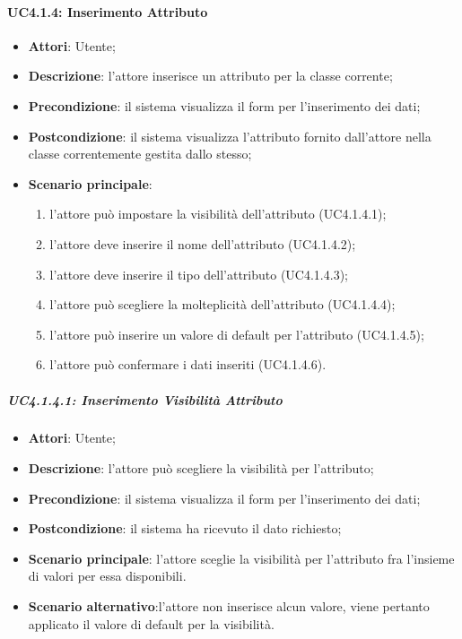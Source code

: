 \paragraph{UC4.1.4: Inserimento Attributo}
\label{UC4.1.4}
\begin{itemize}
\item \textbf{Attori}: Utente;
\item \textbf{Descrizione}: l'attore inserisce un attributo per la classe corrente;
\item \textbf{Precondizione}: il sistema visualizza il form per l'inserimento dei dati;
\item \textbf{Postcondizione}: il sistema visualizza l'attributo fornito dall'attore nella classe correntemente gestita dallo stesso;
\item \textbf{Scenario principale}:
\begin{enumerate}
	\item l'attore può impostare la visibilità dell'attributo (UC4.1.4.1);
	\item l'attore deve inserire il nome dell'attributo (UC4.1.4.2);
	\item l'attore deve inserire il tipo dell'attributo (UC4.1.4.3);
	\item l'attore può scegliere la molteplicità dell'attributo (UC4.1.4.4);
	\item l'attore può inserire un valore di default per l'attributo (UC4.1.4.5);
	\item l'attore può confermare i dati inseriti (UC4.1.4.6).
\end{enumerate}
\end{itemize}

\subparagraph{UC4.1.4.1: Inserimento Visibilità Attributo}
\label{UC4.1.4.1}
\begin{itemize}
\item \textbf{Attori}: Utente;
\item \textbf{Descrizione}: l'attore può scegliere la visibilità per l'attributo;
\item \textbf{Precondizione}: il sistema visualizza il form per l'inserimento dei dati;
\item \textbf{Postcondizione}: il sistema ha ricevuto il dato richiesto;
\item \textbf{Scenario principale}:
l'attore sceglie la visibilità per l'attributo fra l'insieme di valori per essa disponibili.
\item \textbf{Scenario alternativo}:l'attore non inserisce alcun valore, viene pertanto applicato il valore di default per la visibilità.
\end{itemize}

